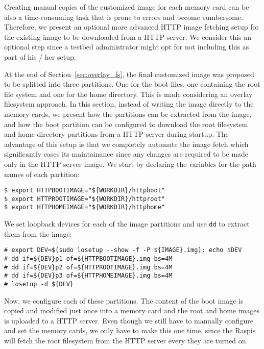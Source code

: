 \label{sec:testbed_http}
Creating manual copies of the customized image for each memory card can
be also a time-consuming task that is prone to errors and become
cumbersome. Therefore, we present an optional more advanced \ac{HTTP}
image fetching setup for the existing image to be downloaded from a
\ac{HTTP} server. We consider this an optional step since a testbed
administrator might opt for not including this as part of his / her setup.

At the end of Section~\ref{sec:overlay_fs}, the final customized image was
proposed to be splitted into three partitions. One for the boot files, one
containing the root file system and one for the home directory. This is made
considering an overlay filesystem approach. In this section, instead of
writing the image directly to the memory cards, we present how the
partitions can be extracted from the image, and how the boot partition can
be configured to download the root filesystem and home directory partitions
from a \ac{HTTP} server during startup. The advantage of this setup is that
we completely automate the image fetch which significantly eases its
maintainance since any changes are required to be made only in the \ac{HTTP}
server image. We start by declaring the variables for the path names of each
partition:

\begin{lstlisting}[]
$ export HTTPBOOTIMAGE="${WORKDIR}/httpboot"
$ export HTTPROOTIMAGE="${WORKDIR}/httproot"
$ export HTTPHOMEIMAGE="${WORKDIR}/httphome"
\end{lstlisting}
\FloatBarrier
\vspace{-5mm}

We set loopback devices for each of the image partitions and use \texttt{dd} to
extract them from the image:
\begin{lstlisting}[]
# export DEV=$(sudo losetup --show -f -P ${IMAGE}.img); echo $DEV
# dd if=${DEV}p1 of=${HTTPBOOTIMAGE}.img bs=4M
# dd if=${DEV}p2 of=${HTTPROOTIMAGE}.img bs=4M
# dd if=${DEV}p3 of=${HTTPHOMEIMAGE}.img bs=4M
# losetup -d ${DEV}
\end{lstlisting}
\FloatBarrier
\vspace{-5mm}

Now, we configure each of these partitions. The content of the boot image is
copied and modified just once into a memory card and the root
and home images is uploaded to a \ac{HTTP} server. Even though we still
have to manually configure and set the memory cards, we only have
to make this one time, since the \ac{Raspi}s will fetch the root filesystem
from the \ac{HTTP} server every they are turned on.

